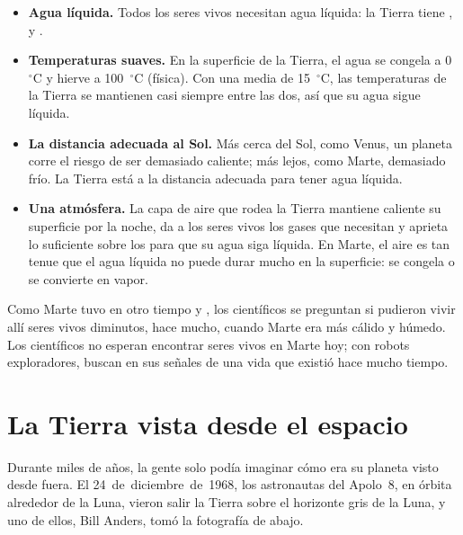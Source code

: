 \begin{itemize}
  \item \textbf{Agua líquida.} Todos los seres vivos necesitan agua
        líquida: la Tierra tiene ,  y .
  \item \textbf{Temperaturas suaves.} En la superficie de la Tierra, el
        agua se congela a 0~$^\circ$C y hierve a 100~$^\circ$C (física).
        Con una media de 15~$^\circ$C, las temperaturas de la Tierra se
        mantienen casi siempre entre las dos, así que su agua sigue líquida.
  \item \textbf{La distancia adecuada al Sol.} Más cerca del Sol, como
        Venus, un planeta corre el riesgo de ser demasiado caliente; más
        lejos, como Marte, demasiado frío. La Tierra está a la distancia
        adecuada para tener agua líquida.
  \item \textbf{Una atmósfera.} La capa de aire que rodea la Tierra mantiene
        caliente su superficie por la noche, da a los seres vivos los gases
        que necesitan y aprieta lo suficiente sobre los  para que su
        agua siga líquida. En Marte, el aire es tan tenue que el agua
        líquida no puede durar mucho en la superficie: se congela o se
        convierte en vapor.
\end{itemize}

\begin{remark}\label{rem:g6:earth-a-planet:mars-life}
Como Marte tuvo en otro tiempo  y , los científicos se preguntan
si pudieron vivir allí seres vivos diminutos, hace mucho, cuando Marte era
más cálido y húmedo. Los científicos no esperan encontrar seres vivos en
Marte hoy; con robots exploradores, buscan en sus  señales de una vida
que existió hace mucho tiempo.
\end{remark}

\section{La Tierra vista desde el espacio}

Durante miles de años, la gente solo podía imaginar cómo era su planeta
visto desde fuera. El 24~de~diciembre~de~1968, los astronautas del Apolo~8,
en órbita alrededor de la Luna, vieron salir la Tierra sobre el horizonte
gris de la Luna, y uno de ellos, Bill Anders, tomó la fotografía de abajo.

